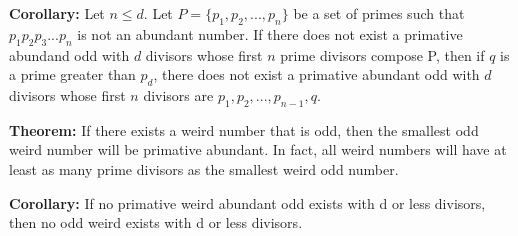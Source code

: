 \documentclass[../paper.tex]{subfiles}
\begin{document}
\textbf{Corollary:} 
Let $n \leq d$. Let $P = \{p_1, p_2, ..., p_n\}$ be a set of primes
such that $p_1 p_2 p_3 ... p_n$ is not an abundant number.
If there does not exist a primative abundand odd with $d$ divisors
whose first $n$ prime divisors compose P, then if $q$ is a prime 
greater than $p_d$, there does not exist a primative abundant odd
with $d$ divisors whose first $n$ divisors are $p_1, p_2, ...,
p_{n-1}, q$.

\textbf{Theorem:} If there exists a weird number that is odd, 
then the smallest odd weird number will be primative abundant.
In fact, all weird numbers will have at least as many prime
divisors as the smallest weird odd number.

\textbf{Corollary:} If no primative weird abundant odd exists
with d or less divisors, then no odd weird exists with d or less
divisors.
\end{document}
